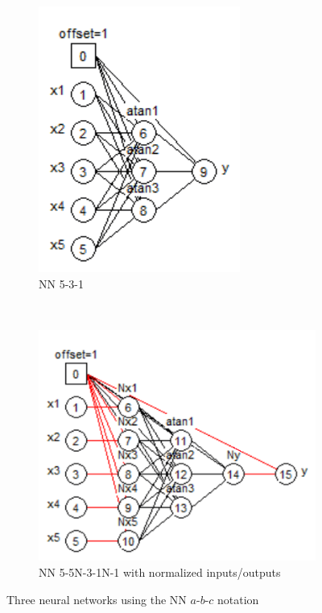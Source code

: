 \begin{figure}
\begin{subfigure}[b]{0.250\textwidth}
        \includegraphics[width=\textwidth]{RN3b2.png}
        \caption{NN 5-3-1}
        \label{fig:N531}
    \end{subfigure}
    ~ 
    \begin{subfigure}[b]{0.396\textwidth}
        \includegraphics[width=\textwidth]{RN3c2.png}
        \caption{NN 5-5N-3-1N-1 with normalized inputs/outputs}
        \label{fig:N55311}
    \end{subfigure}
    \caption{Three neural networks using the NN $a$-$b$-$c$ notation}
    \label{fig:NNexamples}
\end{figure}

